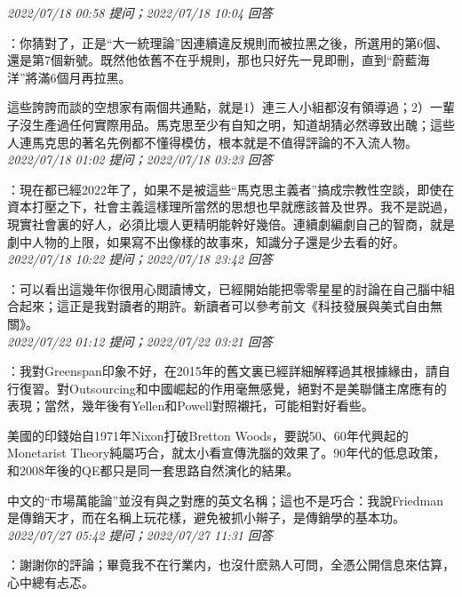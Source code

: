 \documentclass[twocolumn]{ctexart}
\begin{document}
\textit{\hfill\noindent\small 2022/07/18 00:58 提问；2022/07/18 10:04 回答}

：你猜對了，正是“大一統理論”因連續違反規則而被拉黑之後，所選用的第6個、還是第7個新號。既然他依舊不在乎規則，那也只好先一見即刪，直到“蔚藍海洋”將滿6個月再拉黑。

這些誇誇而談的空想家有兩個共通點，就是1）連三人小組都沒有領導過；2）一輩子沒生產過任何實際用品。馬克思至少有自知之明，知道胡猜必然導致出醜；這些人連馬克思的著名先例都不懂得模仿，根本就是不值得評論的不入流人物。
\\

\textit{\hfill\noindent\small 2022/07/18 01:02 提问；2022/07/18 03:23 回答}

：現在都已經2022年了，如果不是被這些“馬克思主義者”搞成宗教性空談，即使在資本打壓之下，社會主義這樣理所當然的思想也早就應該普及世界。我不是説過，現實社會裏的好人，必須比壞人更精明能幹好幾倍。連續劇編劇自己的智商，就是劇中人物的上限，如果寫不出像樣的故事來，知識分子還是少去看的好。
\\

\textit{\hfill\noindent\small 2022/07/18 10:22 提问；2022/07/18 23:42 回答}

：可以看出這幾年你很用心閲讀博文，已經開始能把零零星星的討論在自己腦中組合起來；這正是我對讀者的期許。新讀者可以參考前文《科技發展與美式自由無關》。
\\

\textit{\hfill\noindent\small 2022/07/22 01:12 提问；2022/07/22 03:21 回答}

：我對Greenspan印象不好，在2015年的舊文裏已經詳細解釋過其根據緣由，請自行復習。對Outsourcing和中國崛起的作用毫無感覺，絕對不是美聯儲主席應有的表現；當然，幾年後有Yellen和Powell對照襯托，可能相對好看些。

美國的印錢始自1971年Nixon打破Bretton Woods，要説50、60年代興起的Monetarist Theory純屬巧合，就太小看宣傳洗腦的效果了。90年代的低息政策，和2008年後的QE都只是同一套思路自然演化的結果。

中文的“市場萬能論”並沒有與之對應的英文名稱；這也不是巧合：我說Friedman是傳銷天才，而在名稱上玩花樣，避免被抓小辮子，是傳銷學的基本功。
\\

\textit{\hfill\noindent\small 2022/07/27 05:42 提问；2022/07/27 11:31 回答}

：謝謝你的評論；畢竟我不在行業内，也沒什麽熟人可問，全憑公開信息來估算，心中總有忐忑。
\end{document}
